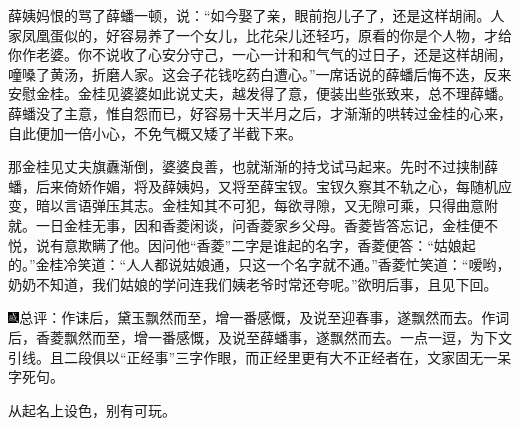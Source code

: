 薛姨妈恨的骂了薛蟠一顿，说：``如今娶了亲，眼前抱儿子了，还是这样胡闹。人家凤凰蛋似的，好容易养了一个女儿，比花朵儿还轻巧，原看的你是个人物，才给你作老婆。你不说收了心安分守己，一心一计和和气气的过日子，还是这样胡闹，噇嗓了黄汤，折磨人家。这会子花钱吃药白遭心。''一席话说的薛蟠后悔不迭，反来安慰金桂。金桂见婆婆如此说丈夫，越发得了意，便装出些张致来，总不理薛蟠。薛蟠没了主意，惟自怨而已，好容易十天半月之后，才渐渐的哄转过金桂的心来，自此便加一倍小心，不免气概又矮了半截下来。

那金桂见丈夫旗纛渐倒，婆婆良善，也就渐渐的持戈试马起来。先时不过挟制薛蟠，后来倚娇作媚，将及薛姨妈，又将至薛宝钗。宝钗久察其不轨之心，每随机应变，暗以言语弹压其志。金桂知其不可犯，每欲寻隙，又无隙可乘，只得曲意附就。一日金桂无事，因和香菱闲谈，问香菱家乡父母。香菱皆答忘记，金桂便不悦，说有意欺瞒了他。因问他``香菱''二字是谁起的名字，香菱便答：``姑娘起的。''金桂冷笑道：``人人都说姑娘通，只这一个名字就不通。''香菱忙笑道：``嗳哟，奶奶不知道，我们姑娘的学问连我们姨老爷时常还夸呢。''欲明后事，且见下回。

{\includegraphics[width=3mm]{../Images/00005}\kaishu 总评：作诔后，黛玉飘然而至，增一番感慨，及说至迎春事，遂飘然而去。作词后，香菱飘然而至，增一番感慨，及说至薛蟠事，遂飘然而去。一点一逗，为下文引线。且二段俱以``正经事''三字作眼，而正经里更有大不正经者在，文家固无一呆字死句。}

{\kaishu 从起名上设色，别有可玩。}
